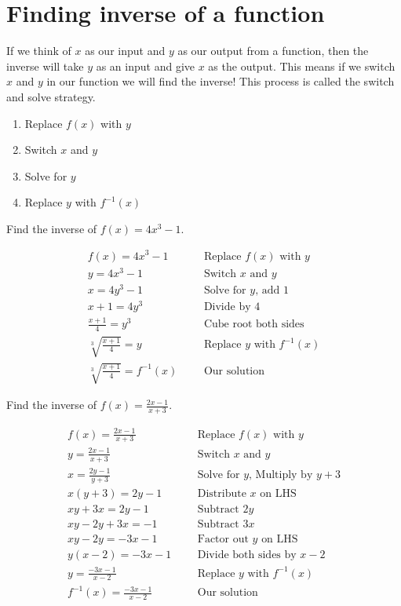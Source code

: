 \section{Finding inverse of a function}
If we think of $x$ as our input and $y$ as our output from a function, then the inverse will take $y$ as an input and give $x$ as the output. This means if we switch $x$ and $y$ in our function we will find the inverse! This process is called the switch and solve strategy.
\begin{enumerate}
    \item Replace $f(x)$ with $y$
    \item Switch $x$ and $y$
    \item Solve for $y$
    \item Replace $y$ with $f^{-1}(x)$
\end{enumerate}
\newpage
\begin{exa}
    Find the inverse of $f(x) = 4x^3-1$.
\end{exa}
%
\begin{align*}
    f(x) = 4x^3-1&      &       &\text{Replace $f(x)$ with $y$}\\
    y = 4x^3-1&     &       &\text{Switch $x$ and $y$}\\
    x = 4y^3-1&     &       &\text{Solve for $y$, add 1}\\
    x+1 = 4y^3&     &       &\text{Divide by 4}\\
    \frac{x+1}{4}=y^3&      &       &\text{Cube root both sides}\\
    \sqrt[3]{\frac{x+1}{4}} = y&    &   &\text{Replace $y$ with $f^{-1}(x)$}\\
    \sqrt[3]{\frac{x+1}{4}} = f^{-1}(x)&   &   &\text{Our solution}
\end{align*}
\begin{exa}
    Find the inverse of $f(x) = \frac{2x-1}{x+3}$.
\end{exa}
%
\begin{align*}
    f(x) = \frac{2x-1}{x+3}&      &       &\text{Replace $f(x)$ with $y$}\\
    y = \frac{2x-1}{x+3}&     &       &\text{Switch $x$ and $y$}\\
    x = \frac{2y-1}{y+3}&     &       &\text{Solve for $y$, Multiply by $y+3$}\\
    x(y+3) = 2y-1&     &       &\text{Distribute $x$ on LHS}\\
    xy+3x = 2y-1&      &       &\text{Subtract $2y$}\\
    xy-2y+3x = -1&    &   &\text{Subtract $3x$}\\
    xy-2y = -3x-1&    &   &\text{Factor out $y$ on LHS}\\
    y(x-2) = -3x-1&     &   &\text{Divide both sides by $x-2$}\\
    y = \frac{-3x-1}{x-2}&     &   &\text{Replace $y$ with $f^{-1}(x)$}\\
    f^{-1}(x) = \frac{-3x-1}{x-2}&   &   &\text{Our solution}
\end{align*}
